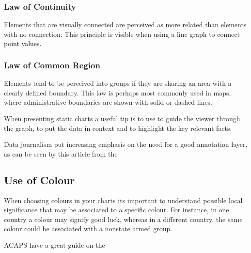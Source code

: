 \documentclass[letterpaper,10pt,english]{jupyterBook}
\begin{document}
\subsubsection{Law of Continuity}
\label{\detokenize{part1/communication:law-of-continuity}}
\sphinxAtStartPar
{}Elements that are visually connected are perceived as more related than elements with no connection.
This principle is visible when using a line graph to connect point values.


\subsubsection{Law of Common Region}
\label{\detokenize{part1/communication:law-of-common-region}}
\sphinxAtStartPar
{}Elements tend to be perceived into groups if they are sharing an area with a clearly defined boundary.
This law is perhaps most commonly used in maps, where administrative boundaries are shown with solid or dashed lines.

\sphinxAtStartPar
When presenting static charts a useful tip is to use  to guide the viewer through the graph, to put the data in context and to highlight the key relevant facts. %
\begin{footnote}[3]\sphinxAtStartFootnote
Data journalism put increasing emphasis on the need for a good annotation layer, as can be seen by this article from the 
%
\end{footnote}


\subsection{Use of Colour}
\label{\detokenize{part1/communication:use-of-colour}}
\sphinxAtStartPar
When choosing colours in your charts its important to understand possible local significance that may be associated to a specific colour. For instance, in one country a colour may signify good luck, whereas in a different country, the same colour could be associated with a non\sphinxhyphen{}state armed group.%
\begin{footnote}[4]\sphinxAtStartFootnote
ACAPS have a great guide on the 
%
\end{footnote}
\end{document}
